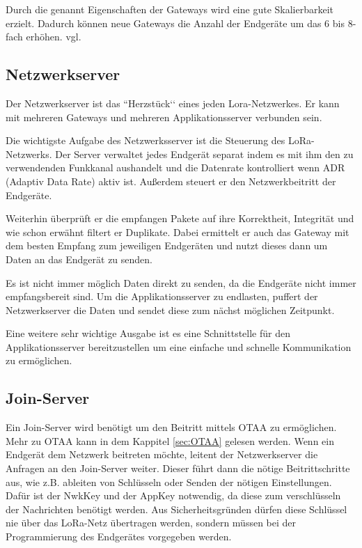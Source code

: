 \documentclass[a4paper, 12pt]{article}
\begin{document}
            Durch die genannt Eigenschaften der Gateways wird eine gute Skalierbarkeit erzielt. Dadurch können neue 
            Gateways die Anzahl der Endgeräte um das 6 bis 8-fach erhöhen. vgl. \cite[S.10]{WhatIsLoRa}
        \subsection{Netzwerkserver}
            Der Netzwerkserver ist das ``Herzstück‘‘ eines jeden Lora-Netzwerkes. Er kann mit mehreren Gateways und 
            mehreren Applikationsserver verbunden sein. 

            Die wichtigste Aufgabe des Netzwerksserver ist die Steuerung des LoRa-Netzwerks. Der Server 
            verwaltet jedes Endgerät separat indem es mit ihm den zu verwendenden Funkkanal aushandelt und die Datenrate
             kontrolliert wenn ADR (Adaptiv Data Rate) aktiv ist. Außerdem steuert er den Netzwerkbeitritt der 
             Endgeräte.

            Weiterhin überprüft er die empfangen Pakete auf ihre Korrektheit, Integrität und wie schon erwähnt 
            filtert er Duplikate.
            Dabei ermittelt er auch das Gateway mit dem besten Empfang zum jeweiligen Endgeräten und nutzt 
            dieses dann um Daten an das Endgerät zu senden.

            Es ist nicht immer möglich Daten direkt zu senden, da die Endgeräte nicht immer empfangsbereit sind. Um 
            die Applikationsserver zu endlasten, puffert der Netzwerkserver die Daten und sendet diese zum nächst 
            möglichen Zeitpunkt.

            Eine weitere sehr wichtige Ausgabe ist es eine Schnittstelle für den Applikationsserver bereitzustellen 
            um eine 
            einfache und schnelle Kommunikation zu ermöglichen.
        \subsection{Join-Server}
            Ein Join-Server wird benötigt um den Beitritt mittels OTAA zu ermöglichen. Mehr zu OTAA kann in dem 
            Kappitel \ref{sec:OTAA}  gelesen werden. Wenn ein Endgerät dem Netzwerk beitreten möchte, leitent 
            der Netzwerkserver die Anfragen an den Join-Server weiter. Dieser führt dann die nötige Beitrittschritte 
            aus, wie z.B. ableiten von Schlüsseln oder Senden der nötigen Einstellungen. Dafür ist der NwkKey und 
            der AppKey notwendig, da diese zum verschlüsseln der Nachrichten benötigt werden. 
            Aus Sicherheitsgründen dürfen diese Schlüssel nie über das LoRa-Netz übertragen werden, sondern müssen
            bei der Programmierung des Endgerätes vorgegeben werden. \cite[S. 9 f.]{LoRaBack}
\end{document}
